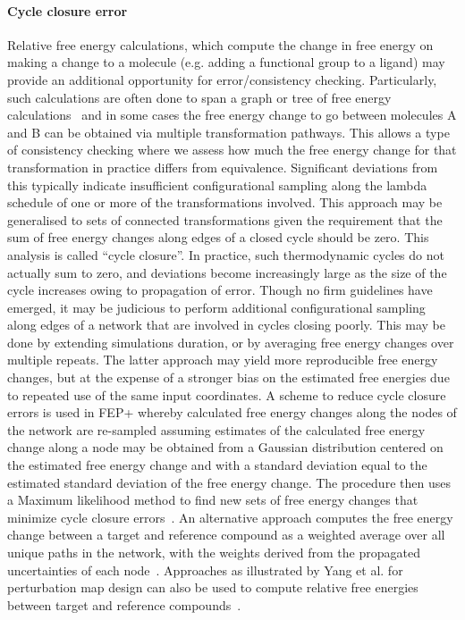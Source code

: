 \documentclass[9pt,bestpractices]{livecoms}
\begin{document}
\paragraph{Cycle closure error}
Relative free energy calculations, which compute the change in free energy on making a change to a molecule (e.g. adding a functional group to a ligand) may provide an additional opportunity for error/consistency checking. Particularly, such calculations are often done to span a graph or tree of free energy calculations~\cite{xu2019diffnet,wang2013modeling,liu2013lead} and in some cases the free energy change to go between molecules A and B can be obtained via multiple transformation pathways. This allows a type of consistency checking where we assess how much the free energy change for that transformation in practice differs from equivalence. Significant deviations from this typically indicate insufficient configurational sampling along the lambda schedule of one or more of the transformations involved.
%
This approach may be generalised to sets of connected transformations given the requirement that the sum of free energy changes along edges of a closed cycle should be zero. This analysis is called ``cycle closure''. In practice, such thermodynamic cycles do not actually sum to zero,  and deviations become increasingly large as the size of the cycle increases owing to propagation of error. Though no firm guidelines have emerged, it may be judicious to perform additional configurational sampling along edges of a network that are involved in cycles closing poorly. This may be done by extending simulations duration, or by averaging free energy changes over multiple repeats. The latter approach may yield more reproducible free energy changes, but at the expense of a stronger bias on the estimated free energies due to repeated use of the same input coordinates.
%
A scheme to reduce cycle closure errors is used in FEP+ whereby calculated free energy changes along the nodes of the network are re-sampled assuming estimates of the calculated free energy change along a node may be obtained from a Gaussian distribution centered on the estimated free energy change and with a standard deviation equal to the estimated standard deviation of the free energy change. The procedure then uses a Maximum likelihood method to find new sets of free energy changes that minimize cycle closure errors~\cite{wang2013modeling}. An alternative approach computes the free energy change between a target and reference compound as a weighted average over all unique paths in the network, with the weights derived from the propagated uncertainties of each node~\cite{mey2016blinded}. Approaches as illustrated by Yang et al. for perturbation map design can also be used to compute relative free energies between target and reference compounds~\cite{yang2020optimal}.
%
\end{document}
